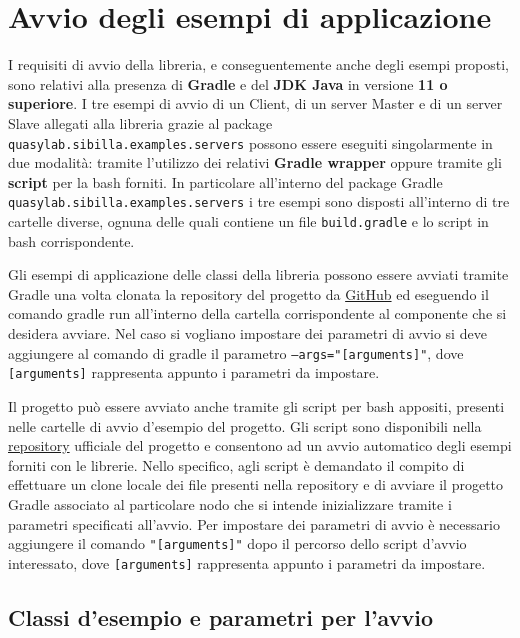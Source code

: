 \section{Avvio degli esempi di applicazione}
I requisiti di avvio della libreria, e conseguentemente anche degli esempi proposti, sono relativi alla presenza di \textbf{Gradle} e del \textbf{JDK Java} in versione \textbf{11 o superiore}.
I tre esempi di avvio di un Client, di un server Master e di un server Slave allegati alla libreria grazie al package \texttt{quasylab.sibilla.examples.servers} possono essere eseguiti singolarmente in due modalità: tramite l’utilizzo dei relativi \textbf{Gradle wrapper} oppure tramite gli \textbf{script} per la bash forniti. In particolare all’interno del package Gradle \texttt{quasylab.sibilla.examples.servers} i tre esempi sono disposti all’interno di tre cartelle diverse, ognuna delle quali contiene un file \texttt{build.gradle} e lo script in bash corrispondente.

Gli esempi di applicazione delle classi della libreria possono essere avviati tramite Gradle una volta clonata la repository del progetto da \href{https://github.com/quasylab/sibilla/tree/working}{GitHub} ed eseguendo il comando gradle run all’interno della cartella corrispondente al componente che si desidera avviare. Nel caso si vogliano impostare dei parametri di avvio si deve aggiungere al comando di gradle il parametro \texttt{--args="[arguments]"}, dove \texttt{[arguments]} rappresenta appunto i parametri da impostare.

Il progetto può essere avviato anche tramite gli script per bash appositi, presenti nelle cartelle di avvio d'esempio del progetto. Gli script sono disponibili nella \href{https://github.com/quasylab/sibilla/tree/working}{repository} ufficiale del progetto e consentono ad un avvio automatico degli esempi forniti con le librerie. Nello specifico, agli script è demandato il compito di effettuare un clone locale dei file presenti nella repository e di avviare il progetto Gradle associato al particolare nodo che si intende inizializzare tramite i parametri specificati all'avvio. Per impostare dei parametri di avvio è necessario aggiungere il comando \texttt{"[arguments]"} dopo il percorso dello script d'avvio interessato, dove \texttt{[arguments]} rappresenta appunto i parametri da impostare.

\subsection{Classi d'esempio e parametri per l'avvio}

